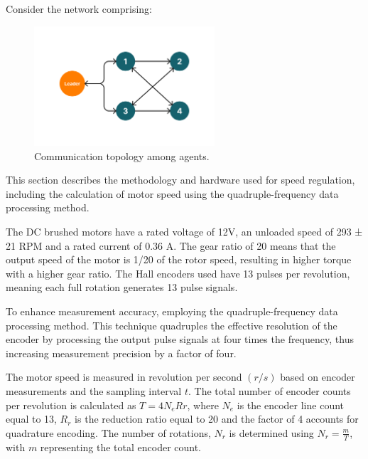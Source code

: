 \documentclass[journal,onecolumn]{IEEEtran}
\begin{document}
Consider the network comprising:

\begin{figure}[H]
    \centering
    \includegraphics[width=0.6\textwidth]{communication.png}
    \caption{Communication topology among agents.}
    \label{fig:communication1} %
\end{figure}

This section describes the methodology and hardware used for speed regulation, including the calculation of motor speed using the quadruple-frequency data processing  method.


The DC brushed motors have a rated voltage of 12V, an unloaded speed of 293 ± 21 RPM and a rated current of 0.36 A. The gear ratio of 20 means that the output speed of the motor is 1/20 of the rotor speed, resulting in higher torque with a higher gear ratio. The Hall encoders used have 13 pulses per revolution, meaning each full rotation generates 13 pulse signals. 

To enhance measurement accuracy, employing the quadruple-frequency data processing method. This technique quadruples the effective resolution of the encoder by processing the output pulse signals at four times the frequency, thus increasing measurement precision by a factor of four.


The motor speed is measured in revolution per second $(r/s)$ based on encoder measurements and the sampling interval $t$. The total number of encoder counts per revolution is calculated as $ T=4N_{e}R{r} $, where $N_e$ is the encoder line count equal to 13, $R_r$ is the reduction ratio equal to 20 and the factor of 4 accounts for quadrature encoding. The number of rotations, $N_r$ is determined using $N_r = \frac{m}{T}$, with $m$ representing the total encoder count.
\end{document}
